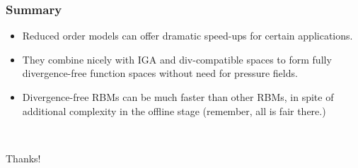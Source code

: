 \documentclass{beamer}
\begin{document}
\begin{frame}
  \frametitle{Summary}
  \begin{itemize}
  \item Reduced order models can offer dramatic speed-ups for certain applications.
  \item They combine nicely with IGA and div-compatible spaces to form fully
    divergence-free function spaces without need for pressure fields.
  \item Divergence-free RBMs can be much faster than other RBMs, in spite of additional complexity
    in the offline stage (remember, all is fair there.)
  \end{itemize}
  ~\\ \begin{center} Thanks! \end{center}
\end{frame}
\end{document}

